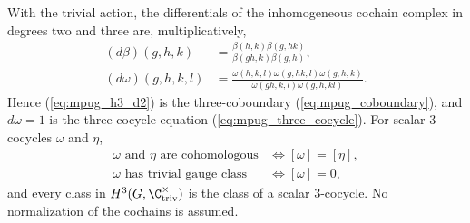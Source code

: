 \begin{theorem}
    \label{thm:mpug_h3_group_cohomology}
    \leanok
    With the trivial action, the differentials of the inhomogeneous cochain
    complex in degrees two and three are, multiplicatively,
    \begin{align}
        (d\beta)(g,h,k)
         & =\frac{\beta(h,k)\beta(g,hk)}{\beta(gh,k)\beta(g,h)},
        \label{eq:mpug_h3_d2}                                    \\
        (d\omega)(g,h,k,l)
         & =\frac{\omega(h,k,l)\omega(g,hk,l)\omega(g,h,k)}
            {\omega(gh,k,l)\omega(g,h,kl)}.
        \label{eq:mpug_h3_d3}
    \end{align}
    Hence (\ref{eq:mpug_h3_d2}) is the three-coboundary
    (\ref{eq:mpug_coboundary}), and $d\omega=1$ is the three-cocycle equation
    (\ref{eq:mpug_three_cocycle}). For scalar $3$-cocycles $\omega$ and
    $\eta$,
    \begin{align}
        \omega\text{ and }\eta\text{ are cohomologous}
         & \iff [\omega]=[\eta],
        \label{eq:mpug_h3_cohomologous} \\
        \omega\text{ has trivial gauge class}
         & \iff [\omega]=0,
        \label{eq:mpug_h3_trivial}
    \end{align}
    and every class in $H^3(G,\C^\times_{\mathrm{triv}})$ is the class of a
    scalar $3$-cocycle. No normalization of the cochains is assumed.
\end{theorem}
